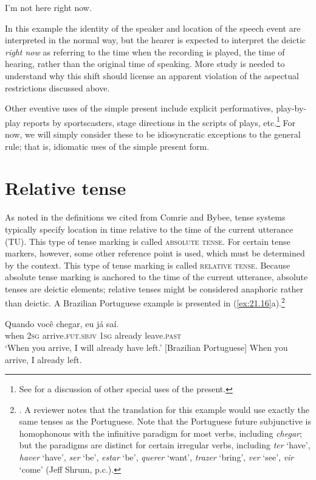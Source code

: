 \ea \label{ex:21.15}
I’m not here right now.
\z


In this example the identity of the speaker and location of the speech event are interpreted in the normal way, but the hearer is expected to interpret the deictic \textit{right now} as referring to the time when the recording is played, the time of hearing, rather than the original time of speaking. More study is needed to understand why this shift should license an apparent violation of the aspectual restrictions discussed above.



Other eventive uses of the simple present include explicit performatives, play-by-play reports by sportscasters, stage directions in the scripts of plays, etc.\footnote{See \citet{Klein2009} for a discussion of other special uses of the present.} For now, we will simply consider these to be idiosyncratic exceptions to the general rule; that is, idiomatic uses of the simple present form.


\section{Relative tense}\label{sec:21.4}

As noted in the definitions we cited from Comrie and Bybee, tense systems typically specify location in time relative to the time of the current utterance (TU). This type of tense marking is called \textsc{absolute tense}. For certain tense markers, however, some other reference point is used, which must be determined by the context. This type of tense marking is called \textsc{relative tense}. Because absolute tense marking is anchored to the time of the current utterance, absolute tenses are deictic elements; relative tenses might be considered anaphoric rather than deictic. A  Brazilian Portuguese example is presented in (\ref{ex:21.16}a).\footnote{\citet[31]{Comrie1985}. A reviewer notes that the  translation for this example would use exactly the same tenses as the {Portuguese}. Note that the {Portuguese} future subjunctive is homophonous with the infinitive paradigm for most verbs, including \textit{chegar}; but the paradigms are distinct for certain irregular verbs, including \textit{ter} ‘have’, \textit{haver} ‘have’, \textit{ser} ‘be’, \textit{estar} ‘be’, \textit{querer} ‘want’, \textit{trazer} ‘bring’, \textit{ver} ‘see’, \textit{vir} ‘come’ (Jeff Shrum, p.c.).}


\ea \label{ex:21.16}
\ea  \gll Quando  você  chegar, eu  já  saí.\\
when  \textsc{2sg}  arrive.\textsc{fut.sbjv}  \textsc{1sg}  already  leave.\textsc{past}\\
\glt ‘When you arrive, I will already have left.’   [{Brazilian} {Portuguese}]
\ex   *When you arrive, I already left.
\z 
\z



